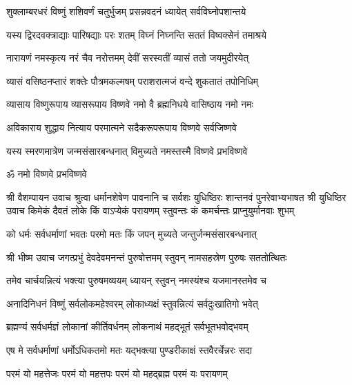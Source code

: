 
\twolineshloka
{शुक्लाम्बरधरं विष्णुं शशिवर्णं चतुर्भुजम्}
{प्रसन्नवदनं ध्यायेत् सर्वविघ्नोपशान्तये}

\twolineshloka
{यस्य द्विरदवक्त्राद्याः पारिषद्याः परः शतम्}
{विघ्नं निघ्नन्ति सततं विष्वक्सेनं तमाश्रये}

\twolineshloka
{नारायणं नमस्कृत्य नरं चैव नरोत्तमम्}
{देवीं सरस्वतीं व्यासं ततो जयमुदीरयेत्}

\twolineshloka
{व्यासं वसिष्ठनप्तारं शक्तेः पौत्रमकल्मषम्}
{पराशरात्मजं वन्दे शुकतातं तपोनिधिम्}

\twolineshloka
{व्यासाय विष्णुरूपाय व्यासरूपाय विष्णवे}
{नमो वै ब्रह्मनिधये वासिष्ठाय नमो नमः}

\twolineshloka
{अविकाराय शुद्धाय नित्याय परमात्मने}
{सदैकरूपरूपाय विष्णवे सर्वजिष्णवे}

\twolineshloka
{यस्य स्मरणमात्रेण जन्मसंसारबन्धनात्}
{विमुच्यते नमस्तस्मै विष्णवे प्रभविष्णवे}

\centerline{ॐ नमो विष्णवे प्रभविष्णवे}
श्री वैशम्पायन उवाच\nopagebreak[4]
\twolineshloka
{श्रुत्वा धर्मानशेषेण पावनानि च सर्वशः}
{युधिष्ठिरः शान्तनवं पुनरेवाभ्यभाषत}
श्री युधिष्ठिर उवाच\nopagebreak[4]
\twolineshloka
{किमेकं दैवतं लोके किं वाऽप्येकं परायणम्}
{स्तुवन्तः कं कमर्चन्तः प्राप्नुयुर्मानवाः शुभम्}

\twolineshloka
{को धर्मः सर्वधर्माणां भवतः परमो मतः}
{किं जपन् मुच्यते जन्तुर्जन्मसंसारबन्धनात्}

श्री भीष्म उवाच\nopagebreak[4]
\twolineshloka
{जगत्प्रभुं देवदेवमनन्तं पुरुषोत्तमम्}
{स्तुवन् नामसहस्रेण पुरुषः सततोत्थितः}

\twolineshloka
{तमेव चार्चयन्नित्यं भक्त्या पुरुषमव्ययम्}
{ध्यायन् स्तुवन् नमस्यंश्च यजमानस्तमेव च}

\twolineshloka
{अनादिनिधनं विष्णुं सर्वलोकमहेश्वरम्}
{लोकाध्यक्षं स्तुवन्नित्यं सर्वदुःखातिगो भवेत्}

\twolineshloka
{ब्रह्मण्यं सर्वधर्मज्ञं लोकानां कीर्तिवर्धनम्}
{लोकनाथं महद्भूतं सर्वभूतभवोद्भवम्}

\twolineshloka
{एष मे सर्वधर्माणां धर्मोऽधिकतमो मतः}
{यद्भक्त्या पुण्डरीकाक्षं स्तवैरर्चेन्नरः सदा}

\twolineshloka
{परमं यो महत्तेजः परमं यो महत्तपः}
{परमं यो महद्ब्रह्म परमं यः परायणम्}

